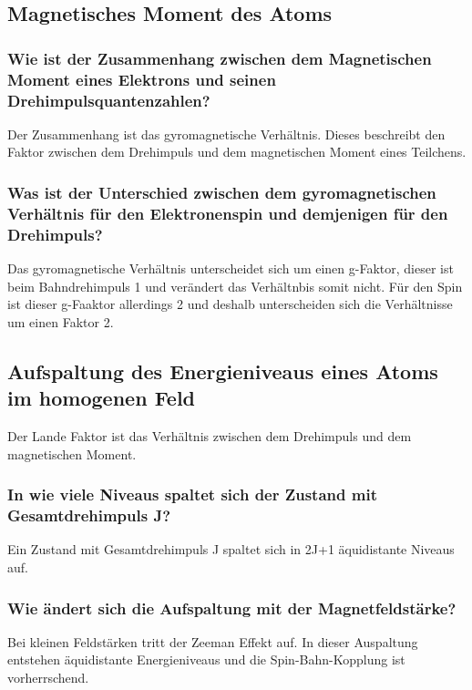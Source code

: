 \subsection{Magnetisches Moment des Atoms}

\subsubsection{Wie ist der Zusammenhang zwischen dem Magnetischen Moment eines Elektrons und seinen Drehimpulsquantenzahlen?}

Der Zusammenhang ist das gyromagnetische Verhältnis. Dieses beschreibt den Faktor zwischen dem Drehimpuls und dem magnetischen Moment eines Teilchens.

\subsubsection{Was ist der Unterschied zwischen dem gyromagnetischen Verhältnis für den Elektronenspin und demjenigen für den Drehimpuls?}

Das gyromagnetische Verhältnis unterscheidet sich um einen g-Faktor, dieser ist beim Bahndrehimpuls 1 und verändert das Verhältnbis somit nicht. Für den Spin ist dieser g-Faaktor allerdings 2 und deshalb unterscheiden sich die Verhältnisse um einen Faktor 2.

\subsection{Aufspaltung des Energieniveaus eines Atoms im homogenen Feld}

Der Lande Faktor ist das Verhältnis zwischen dem Drehimpuls und dem magnetischen Moment.

\subsubsection{In wie viele Niveaus spaltet sich der Zustand mit Gesamtdrehimpuls J?}

Ein Zustand mit Gesamtdrehimpuls J spaltet sich in 2J+1 äquidistante Niveaus auf.

\subsubsection{Wie ändert sich die Aufspaltung mit der Magnetfeldstärke?}

Bei kleinen Feldstärken tritt der Zeeman Effekt auf. In dieser Auspaltung entstehen äquidistante Energieniveaus und die Spin-Bahn-Kopplung ist vorherrschend.

